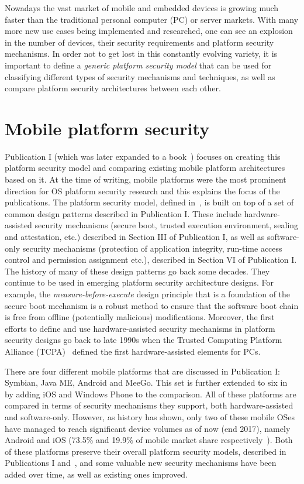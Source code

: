 
Nowadays the vast market of mobile and embedded devices is growing much faster than the traditional personal computer (PC) or server markets. With many more new use cases being implemented and researched, one can see an explosion in the number of devices, their security requirements and platform security mechanisms. In order not to get lost in this constantly evolving variety, it is important to define a \textit{generic platform security model} that can be used for classifying different types of security mechanisms and techniques, as well as compare platform security architectures between each other. 

\section{Mobile platform security}

Publication I (which was later expanded to a book~\cite{2013Asokan}) focuses on creating this platform security model and comparing existing mobile platform architectures based on it. At the time of writing, mobile platforms were the most prominent direction for OS platform security research and this explains the focus of the publications. The platform security model, defined in~\cite{2013Asokan}, is built on top of a set of common design patterns described in Publication I. These include hardware-assisted security mechanisms (secure boot, trusted execution environment, sealing and attestation, etc.) described in Section III of Publication I, as well as software-only security mechanisms (protection of application integrity, run-time access control and permission assignment etc.), described in Section VI of Publication I. The history of many of these design patterns go back some decades. They continue to be used in emerging platform security architecture designs. For example, the \textit{measure-before-execute} design principle that is a foundation of the secure boot mechanism is a robust method to ensure that the software boot chain is free from offline (potentially malicious) modifications. Moreover, the first efforts to define and use hardware-assisted security mechanisms in platform security designs go back to late 1990s when the Trusted Computing Platform Alliance (TCPA)~\cite{pearson2002} defined the first hardware-assisted elements for PCs.

There are four different mobile platforms that are discussed in Publication I: Symbian, Java ME, Android and MeeGo. This set is further extended to six in~\cite{2013Asokan} by adding iOS and Windows Phone to the comparison. All of these platforms are compared in terms of security mechanisms they support, both hardware-assisted and software-only. However, as history has shown, only two of these mobile OSes have managed to reach significant device volumes as of now (end 2017), namely Android and iOS (73.5\% and 19.9\% of mobile market share respectively~\cite{osshare}). Both of these platforms preserve their overall platform security models, described in Publications I and~\cite{2013Asokan}, and some valuable new security mechanisms have been added over time, as well as existing ones improved. 

